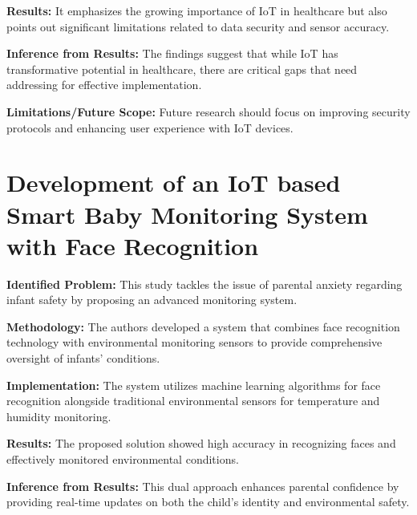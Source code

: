 \documentclass[12pt,a4paper]{report}
\begin{document}
\noindent\textbf{Results:}  It emphasizes the growing importance of IoT in healthcare but also points out significant limitations related to data security and sensor accuracy.
\setlength{\parskip}{1em}  %


\noindent\textbf{Inference from Results:}  The findings suggest that while IoT has transformative potential in healthcare, there are critical gaps that need addressing for effective implementation.

\setlength{\parskip}{1em}  %

\noindent\textbf{Limitations/Future Scope:} Future research should focus on improving security protocols and enhancing user experience with IoT devices.

\setlength{\parskip}{1em}  %


\section{Development of an IoT based Smart Baby Monitoring System with Face Recognition}
\textbf{Identified Problem: }This study tackles the issue of parental anxiety regarding infant safety by proposing an advanced monitoring system\cite{9454187}.
\setlength{\parskip}{1em}  %


\noindent\textbf{Methodology:} The authors developed a system that combines face recognition technology with environmental monitoring sensors to provide comprehensive oversight of infants' conditions.

\setlength{\parskip}{1em}  %


\noindent\textbf{Implementation:} The system utilizes machine learning algorithms for face recognition alongside traditional environmental sensors for temperature and humidity monitoring.

\setlength{\parskip}{1em}  %

\noindent\textbf{Results:}  The proposed solution showed high accuracy in recognizing faces and effectively monitored environmental conditions.

\setlength{\parskip}{1em}  %


\noindent\textbf{Inference from Results:} This dual approach enhances parental confidence by providing real-time updates on both the child's identity and environmental safety.
\end{document}
